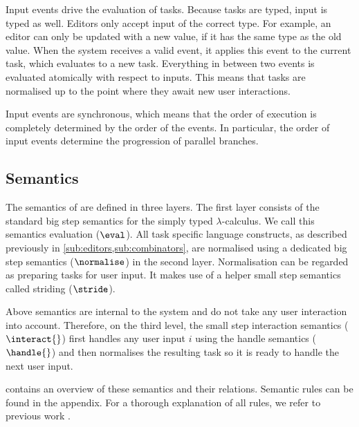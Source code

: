 Input events drive the evaluation of tasks.
Because tasks are typed, input is typed as well.
Editors only accept input of the correct type.
For example, an editor can only be updated with a new value, if it has the same type as the old value.
When the system receives a valid event, it applies this event to the current task, which evaluates to a new task.
Everything in between two events is evaluated atomically with respect to inputs.
This means that tasks are normalised up to the point where they await new user interactions.

Input events are synchronous, which means that the order of execution is completely determined by the order of the events.
In particular, the order of input events determine the progression of parallel branches.


\subsection{Semantics}
\label{sub:semantics}

The semantics of \TOPHAT are defined in three layers.
The first layer consists of the standard big step semantics for the simply typed $\lambda$-calculus.
We call this semantics evaluation ($\eval$).
All task specific language constructs, as described previously in \cref{sub:editors,sub:combinators},
are normalised using a dedicated big step semantics ($\normalise$) in the second layer.
Normalisation can be regarded as preparing tasks for user input.
It makes use of a helper small step semantics called striding ($\stride$).

Above semantics are internal to the system and do not take any user interaction into account.
Therefore, on the third level, the small step interaction semantics ($\interact{}$) first handles any user input $i$ using the handle semantics ($\handle{}$)
and then normalises the resulting task so it is ready to handle the next user input.

 contains an overview of these semantics and their relations.
Semantic rules can be found in the appendix.
For a thorough explanation of all rules, we refer to previous work \cite{DBLP:conf/ppdp/SteenvoordenNK19}.

